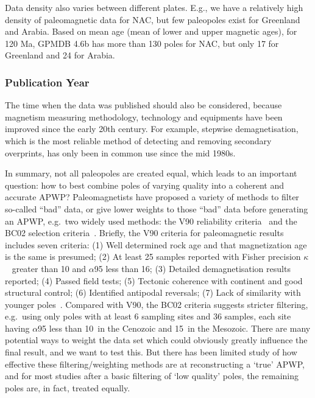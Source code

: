 Data density also varies between different plates. E.g., we have a relatively
high density of paleomagnetic data for NAC, but few paleopoles exist for
Greenland and Arabia. Based on mean age (mean of lower and upper magnetic ages),
for 120 Ma, GPMDB 4.6b has more than 130 poles for NAC, but only 17
for Greenland and 24 for Arabia.

\subsubsection{Publication Year}\label{sec:puby}

The time when the data was published should also be considered, because
magnetism measuring methodology, technology and equipments have been improved
since the early 20th century. For example, stepwise demagnetisation, which is
the most reliable method of detecting and removing secondary overprints, has
only been in common use since the mid 1980s.

In summary, not all paleopoles are created equal, which leads to an important
question: how to best combine poles of varying quality into a coherent and
accurate APWP\@? Paleomagnetists have proposed a variety of methods to filter
so-called ``bad'' data, or give lower weights to those ``bad'' data before
generating an APWP, e.g.\ two widely used methods: the V90 reliability
criteria~\citep{v90} and the BC02 selection criteria~\citep{B02}. Briefly, the
V90 criteria for paleomagnetic results includes seven criteria: (1) Well
determined rock age and that magnetization age is the same is presumed; (2) At
least 25 samples reported with Fisher precision $\kappa$~\citep{F53} greater
than 10 and $\alpha$95 less than 16\degree; (3) Detailed demagnetisation results
reported; (4) Passed field tests; (5) Tectonic coherence with continent and good
structural control; (6) Identified antipodal reversals; (7) Lack of similarity
with younger poles~\citep{T92}. Compared with V90, the BC02 criteria suggests
stricter filtering, e.g.\ using only poles with at least 6 sampling sites and 36
samples, each site having $\alpha$95 less than 10\degree\ in the Cenozoic and
15\degree\ in the Mesozoic. There are many potential ways to weight the data set
which could obviously greatly influence the final result, and we want to test
this. But there has been limited study of how effective these
filtering/weighting methods are at reconstructing a `true' APWP, and for most
studies after a basic filtering of `low quality' poles, the remaining poles are,
in fact, treated equally.

